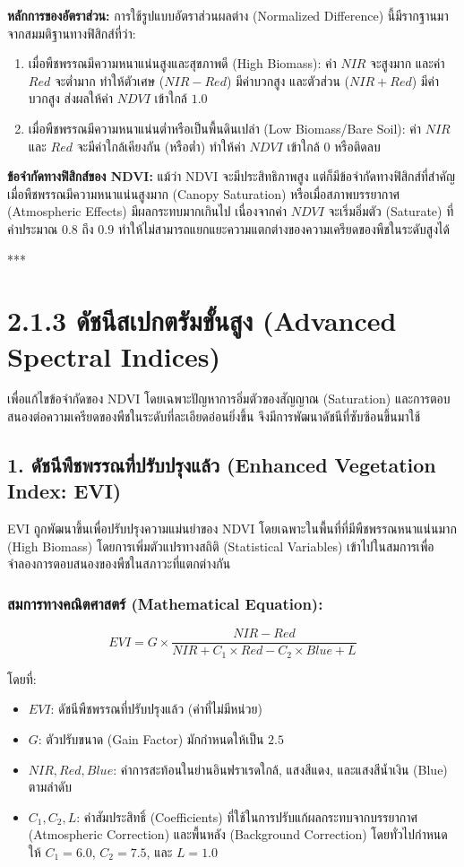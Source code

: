 \documentclass[11pt,a4paper,openany]{report}
\begin{document}
\textbf{หลักการของอัตราส่วน:}
การใช้รูปแบบอัตราส่วนผลต่าง (Normalized Difference) นี้มีรากฐานมาจากสมมติฐานทางฟิสิกส์ที่ว่า:
\begin{enumerate}
  \item เมื่อพืชพรรณมีความหนาแน่นสูงและสุขภาพดี (High Biomass): ค่า $NIR$ จะสูงมาก และค่า $Red$ จะต่ำมาก ทำให้ตัวเศษ ($NIR - Red$) มีค่าบวกสูง และตัวส่วน ($NIR + Red$) มีค่าบวกสูง ส่งผลให้ค่า $NDVI$ เข้าใกล้ $1.0$
  \item เมื่อพืชพรรณมีความหนาแน่นต่ำหรือเป็นพื้นดินเปล่า (Low Biomass/Bare Soil): ค่า $NIR$ และ $Red$ จะมีค่าใกล้เคียงกัน (หรือต่ำ) ทำให้ค่า $NDVI$ เข้าใกล้ $0$ หรือติดลบ
\end{enumerate}


\textbf{ข้อจำกัดทางฟิสิกส์ของ NDVI:}
แม้ว่า NDVI จะมีประสิทธิภาพสูง แต่ก็มีข้อจำกัดทางฟิสิกส์ที่สำคัญเมื่อพืชพรรณมีความหนาแน่นสูงมาก (Canopy Saturation) หรือเมื่อสภาพบรรยากาศ (Atmospheric Effects) มีผลกระทบมากเกินไป เนื่องจากค่า $NDVI$ จะเริ่มอิ่มตัว (Saturate) ที่ค่าประมาณ $0.8$ ถึง $0.9$ ทำให้ไม่สามารถแยกแยะความแตกต่างของความเครียดของพืชในระดับสูงได้

***

\section{2.1.3 ดัชนีสเปกตรัมขั้นสูง (Advanced Spectral Indices)}


เพื่อแก้ไขข้อจำกัดของ NDVI โดยเฉพาะปัญหาการอิ่มตัวของสัญญาณ (Saturation) และการตอบสนองต่อความเครียดของพืชในระดับที่ละเอียดอ่อนยิ่งขึ้น จึงมีการพัฒนาดัชนีที่ซับซ้อนขึ้นมาใช้

\subsection{1. ดัชนีพืชพรรณที่ปรับปรุงแล้ว (Enhanced Vegetation Index: EVI)}


EVI ถูกพัฒนาขึ้นเพื่อปรับปรุงความแม่นยำของ NDVI โดยเฉพาะในพื้นที่ที่มีพืชพรรณหนาแน่นมาก (High Biomass) โดยการเพิ่มตัวแปรทางสถิติ (Statistical Variables) เข้าไปในสมการเพื่อจำลองการตอบสนองของพืชในสภาวะที่แตกต่างกัน

\subsubsection{สมการทางคณิตศาสตร์ (Mathematical Equation):}


$$EVI = G \times \frac{NIR - Red}{NIR + C_1 \times Red - C_2 \times Blue + L}$$


โดยที่:
\begin{itemize}
  \item $EVI$: ดัชนีพืชพรรณที่ปรับปรุงแล้ว (ค่าที่ไม่มีหน่วย)
  \item $G$: ตัวปรับขนาด (Gain Factor) มักกำหนดให้เป็น $2.5$
  \item $NIR, Red, Blue$: ค่าการสะท้อนในย่านอินฟราเรดใกล้, แสงสีแดง, และแสงสีน้ำเงิน (Blue) ตามลำดับ
  \item $C_1, C_2, L$: ค่าสัมประสิทธิ์ (Coefficients) ที่ใช้ในการปรับแก้ผลกระทบจากบรรยากาศ (Atmospheric Correction) และพื้นหลัง (Background Correction) โดยทั่วไปกำหนดให้ $C_1 = 6.0$, $C_2 = 7.5$, และ $L = 1.0$
\end{itemize}
\end{document}

